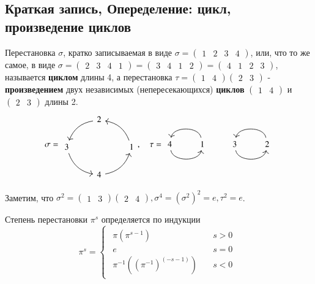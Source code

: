 \documentclass{article}
\begin{document}
\subsection{Краткая запись, Опеределение: цикл, произведение циклов}

Перестановка $\sigma$, кратко записываемая в виде $\sigma = (\begin{matrix}1&2&3&4\end{matrix})$, или, что то же самое, в виде $\sigma = (\begin{matrix}2&3&4&1\end{matrix}) = (\begin{matrix}3&4&1&2\end{matrix}) = (\begin{matrix}4&1&2&3\end{matrix})$, называется \textbf{циклом} длины 4, а перестановка $\tau = (\begin{matrix}1&4\end{matrix})(\begin{matrix}2&3\end{matrix})$ - \textbf{произведением} двух независимых (непересекающихся) \textbf{циклов} $(\begin{matrix}1&4\end{matrix})$ и $(\begin{matrix}2&3\end{matrix})$ длины 2.
\[
\sigma = \begin{tikzcd}
					& 2 \dlar[bend right]	&						\\
3 \drar[bend right]	&						& 1 \ular[bend right]	\\
					& 4 \urar[bend right]	&
\end{tikzcd}, \quad \tau = \begin{tikzcd}
4 \rar[bend right=80] & 1 \lar[bend right=80] & 3 \rar[bend right=80] & 2 \lar [bend right=80]
\end{tikzcd}
\]

Заметим, что $\sigma^2 = (\begin{matrix}1&3\end{matrix})(\begin{matrix}2&4\end{matrix}), \sigma^4 = (\sigma^2)^2 = e, \tau^2 = e$.

Степень перестановки $\pi^s$ определяется по индукции \[
\pi^s = \begin{cases}\begin{array}{ll}
\pi(\pi^{s-1}) \quad				& s > 0 \\
e									& s = 0 \\
\pi^{-1}((\pi^{-1})^{(-s-1)}) \quad	& s < 0
\end{array}
\end{cases}
\]
\end{document}
